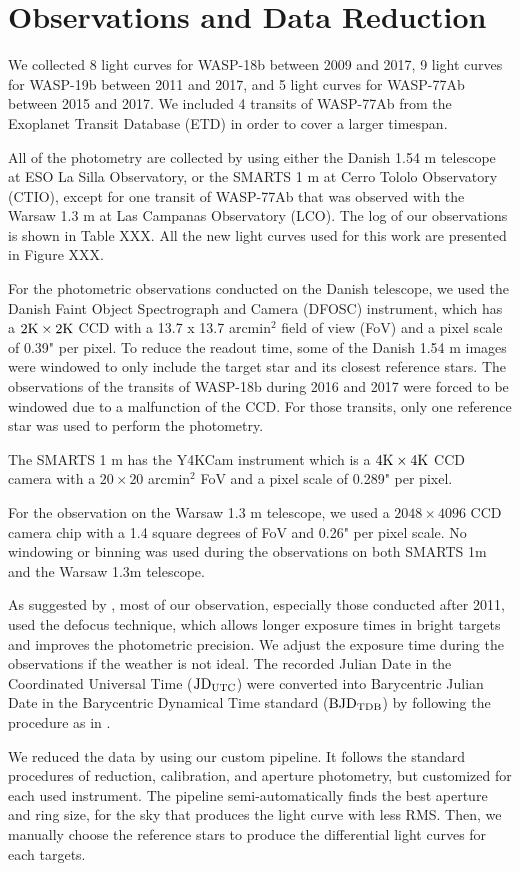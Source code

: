 \chapter{Observations and Data Reduction}\label{chap:obs}

We collected 8 light curves for WASP-18b between 2009 and 2017, 9 light curves for WASP-19b between 2011 and 2017, and 5 light curves for WASP-77Ab between 2015 and 2017. We included 4 transits of WASP-77Ab from the Exoplanet Transit Database (ETD) in order to cover a larger timespan.

All of the photometry are collected by using either the Danish 1.54 m telescope at ESO La Silla Observatory, or the SMARTS 1 m at Cerro Tololo Observatory (CTIO), except for one transit of WASP-77Ab that was observed with the Warsaw 1.3 m at Las Campanas Observatory (LCO). The log of our observations is shown in Table XXX. All the new light curves used for this work are presented in Figure XXX.

For the photometric observations conducted on the Danish telescope, we used the Danish Faint Object Spectrograph and Camera (DFOSC) instrument, which has a $2{\rm K} \times 2{\rm K}$ CCD with a 13.7 x 13.7 arcmin$^2$ field of view (FoV) and a pixel scale of 0.39" per pixel. To reduce the readout time, some of the Danish 1.54 m images were windowed to only include the target star and its closest reference stars. The observations of the transits of WASP-18b during 2016 and 2017 were forced to be windowed due to a malfunction of the CCD. For those transits, only one reference star was used to perform the photometry.

The SMARTS 1 m has the Y4KCam instrument which is a $4{\rm K} \times 4{\rm K}$ CCD camera with a $20\times20$ arcmin$^2$ FoV and a pixel scale of 0.289" per pixel. 

For the observation on the Warsaw 1.3 m telescope, we used a $2048 \times 4096$ CCD camera chip with a 1.4 square degrees of FoV and 0.26" per pixel scale. No windowing or binning was used during the observations on both SMARTS 1m and the Warsaw 1.3m telescope.

As suggested by \cite{Southworth2009}, most of our observation, especially those conducted after 2011, used the defocus technique, which allows longer exposure times in bright targets and improves the photometric precision. We adjust the exposure time during the observations if the weather is not ideal. The recorded Julian Date in the Coordinated Universal Time (${\rm JD_{UTC}}$) were converted into Barycentric Julian Date in the Barycentric Dynamical Time standard (${\rm BJD_{TDB}}$) by following the procedure as in \citet{Eastman2010}.

We reduced the data by using our custom pipeline. It follows the standard procedures of reduction, calibration, and aperture photometry, but customized for each used instrument. The pipeline semi-automatically finds the best aperture and ring size, for the sky that produces the light curve with less RMS. Then, we manually choose the reference stars to produce the differential light curves for each targets.